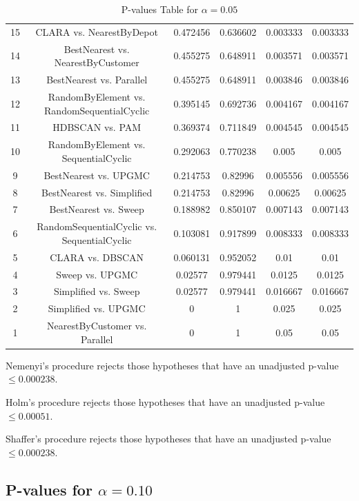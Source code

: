 \documentclass[a4paper,10pt]{article}
\begin{document}
\begin{landscape}
\begin{table}[!htp]
\begin{tabular}{cccccc}
15&CLARA vs. NearestByDepot&0.472456&0.636602&0.003333&0.003333\\
14&BestNearest vs. NearestByCustomer&0.455275&0.648911&0.003571&0.003571\\
13&BestNearest vs. Parallel&0.455275&0.648911&0.003846&0.003846\\
12&RandomByElement vs. RandomSequentialCyclic&0.395145&0.692736&0.004167&0.004167\\
11&HDBSCAN vs. PAM&0.369374&0.711849&0.004545&0.004545\\
10&RandomByElement vs. SequentialCyclic&0.292063&0.770238&0.005&0.005\\
9&BestNearest vs. UPGMC&0.214753&0.82996&0.005556&0.005556\\
8&BestNearest vs. Simplified&0.214753&0.82996&0.00625&0.00625\\
7&BestNearest vs. Sweep&0.188982&0.850107&0.007143&0.007143\\
6&RandomSequentialCyclic vs. SequentialCyclic&0.103081&0.917899&0.008333&0.008333\\
5&CLARA vs. DBSCAN&0.060131&0.952052&0.01&0.01\\
4&Sweep vs. UPGMC&0.02577&0.979441&0.0125&0.0125\\
3&Simplified vs. Sweep&0.02577&0.979441&0.016667&0.016667\\
2&Simplified vs. UPGMC&0&1&0.025&0.025\\
1&NearestByCustomer vs. Parallel&0&1&0.05&0.05\\
\hline
\end{tabular}
\caption{P-values Table for $\alpha=0.05$}
\end{table}Nemenyi's procedure rejects those hypotheses that have an unadjusted p-value $\le0.000238$.

Holm's procedure rejects those hypotheses that have an unadjusted p-value $\le0.00051$.

Shaffer's procedure rejects those hypotheses that have an unadjusted p-value $\le0.000238$.

\pagebreak

\subsection{P-values for $\alpha=0.10$}


\end{landscape}
\end{document}

